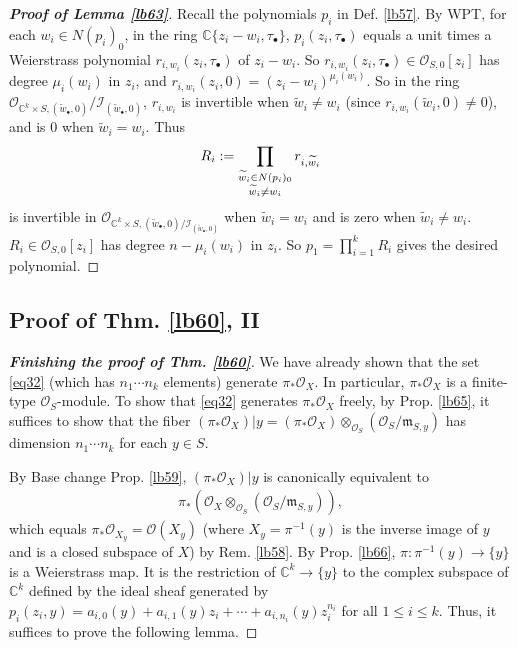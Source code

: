 \documentclass[12pt,b5paper,notitlepage]{report}
\theoremstyle{definition}
\theoremstyle{plain}
\newcommand{\fk}{\mathfrak}
\newcommand{\mc}{\mathcal}
\newcommand{\wtd}{\widetilde}
\newcommand{\scr}{\mathscr}
\newcommand{\blt}{\bullet}
\newcommand{\Cbb}{\mathbb C}
\numberwithin{equation}{section}
\begin{document}
\begin{proof}[\textbf{Proof of Lemma \ref{lb63}}]
Recall the polynomials $p_i$ in Def. \ref{lb57}. By WPT, for each $w_i\in N(p_i)_0$,  in the ring $\Cbb\{z_i-w_i,\tau_\blt\}$, $p_i(z_i,\tau_\blt)$ equals a unit times a Weierstrass polynomial $r_{i,w_i}(z_i,\tau_\blt)$ of $z_i-w_i$. So $r_{i,w_i}(z_i,\tau_\blt)\in\scr O_{S,0}[z_i]$ has degree $\mu_i(w_i)$ in $z_i$, and $r_{i,w_i}(z_i,0)=(z_i-w_i)^{\mu_i(w_i)}$. So in the ring $\scr O_{\Cbb^k\times S,(\wtd w_\blt,0)}/\mc I_{(\wtd w_\blt,0)}$, $r_{i,w_i}$ is invertible when $\wtd w_i\neq w_i$ (since $r_{i,w_i}(\wtd w_i,0)\neq 0$), and is $0$ when $\wtd w_i=w_i$. Thus
\begin{align*}
R_i:=\prod_{\begin{subarray}{c}\wtd w_i\in N(p_i)_0\\
\wtd w_i\neq w_i\end{subarray}}r_{i,\wtd w_i}
\end{align*}
is invertible in $\scr O_{\Cbb^k\times S,(\wtd w_\blt,0)/\mc I_{(\wtd w_\blt,0)}}$ when $\wtd w_i=w_i$ and is zero when $\wtd w_i\neq w_i$. $R_i\in\scr O_{S,0}[z_i]$ has degree $n-\mu_i(w_i)$ in $z_i$. So $p_1=\prod_{i=1}^k R_i$ gives the desired polynomial.
\end{proof}



\subsection{Proof of Thm. \ref{lb60}, II}



\begin{proof}[\textbf{Finishing the proof of Thm. \ref{lb60}}]
We have already shown that the set \eqref{eq32} (which has $n_1\cdots n_k$ elements) generate $\pi_*\scr O_X$. In particular, $\pi_*\scr O_X$ is a finite-type $\scr O_S$-module. To show that \eqref{eq32} generates $\pi_*\scr O_X$ freely, by Prop. \ref{lb65}, it suffices to show that the fiber $(\pi_*\scr O_X)|y=(\pi_*\scr O_X)\otimes_{\scr O_S}(\scr O_S/\fk m_{S,y})$ has dimension $n_1\cdots n_k$ for each $y\in S$.

By Base change Prop. \ref{lb59}, $(\pi_*\scr O_X)|y$ is canonically equivalent to
\begin{align*}
\pi_*(\scr O_X\otimes_{\scr O_S}(\scr O_S/\fk m_{S,y})),
\end{align*}
which equals $\pi_*\scr O_{X_y}=\scr O(X_y)$ (where $X_y=\pi^{-1}(y)$ is the inverse image of $y$ and is a closed subspace of $X$) by Rem. \ref{lb58}. By Prop. \ref{lb66}, $\pi:\pi^{-1}(y)\rightarrow\{y\}$ is a Weierstrass map. It is the restriction of $\Cbb^k\rightarrow \{y\}$ to the complex subspace of $\Cbb^k$ defined by the ideal sheaf generated by $p_i(z_i,y)=a_{i,0}(y)+a_{i,1}(y)z_i+\cdots+a_{i,n_i}(y)z_i^{n_i}$ for all $1\leq i\leq k$. Thus, it suffices to prove the following lemma.
\end{proof}
\end{document}
